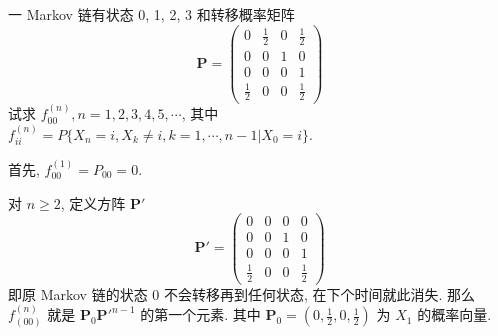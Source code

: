 \documentclass[boxes]{homework}
\begin{document}
\begin{problem}
一 Markov 链有状态 0, 1, 2, 3 和转移概率矩阵
$$
    \boldsymbol{P} = \begin{pmatrix}
        0           & \frac{1}{2} & 0 & \frac{1}{2} \\
        0           & 0           & 1 & 0           \\
        0           & 0           & 0 & 1           \\
        \frac{1}{2} & 0           & 0 & \frac{1}{2}
    \end{pmatrix}
$$
试求 $f_{00}^{(n)}, n = 1, 2, 3, 4, 5, \cdots$, 其中 $f_{ii}^{(n)} = P\{X_n = i, X_k \neq i,
    k = 1, \cdots, n - 1 \vert X_0 = i\}$.
\end{problem}
\begin{solution}
    首先, $f_{00}^{(1)} = P_{00} = 0$.

    对 $n \ge 2$, 定义方阵 $\boldsymbol{P}'$
    \begin{equation}
        \boldsymbol{P}' = \begin{pmatrix}
            0           & 0 & 0 & 0           \\
            0           & 0 & 1 & 0           \\
            0           & 0 & 0 & 1           \\
            \frac{1}{2} & 0 & 0 & \frac{1}{2}
        \end{pmatrix}
    \end{equation}
    即原 Markov 链的状态 0 不会转移再到任何状态, 在下个时间就此消失. 那么 $f_{(00)}^{(n)}$ 就是
    $\boldsymbol{P}_0{\boldsymbol{P}'}^{n - 1}$ 的第一个元素. 其中 $\boldsymbol{P}_0 =
        (0, \frac{1}{2}, 0, \frac{1}{2})$ 为 $X_1$ 的概率向量.


\end{solution}
\end{document}
